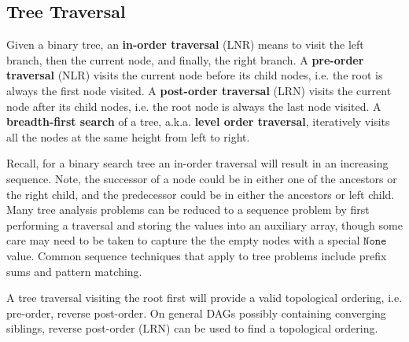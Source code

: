 \documentclass{article}
\begin{document}
    
    \subsection{Tree Traversal}
    Given a binary tree, an \textbf{in-order traversal} (LNR) means to visit the left branch, then the current node, and finally, the right branch. A \textbf{pre-order traversal} (NLR) visits the current node before its child nodes, i.e. the root is always the first node visited. A \textbf{post-order traversal} (LRN) visits the current node after its child nodes, i.e. the root node is always the last node visited. A \textbf{breadth-first search} of a tree, a.k.a. \textbf{level order traversal}, iteratively visits all the nodes at the same height from left to right.
    
    Recall, for a binary search tree an in-order traversal will result in an increasing sequence. Note, the successor of a node could be in either one of the ancestors or the right child, and the predecessor could be in either the ancestors or left child. Many tree analysis problems can be reduced to a sequence problem by first performing a traversal and storing the values into an auxiliary array, though some care may need to be taken to capture the the empty nodes with a special $\mathtt{None}$ value. Common sequence techniques that apply to tree problems include prefix sums and pattern matching.

    A tree traversal visiting the root first will provide a valid topological ordering, i.e. pre-order, reverse post-order. On general DAGs possibly containing converging siblings, reverse post-order (LRN) can be used to find a topological ordering.
\end{document}
